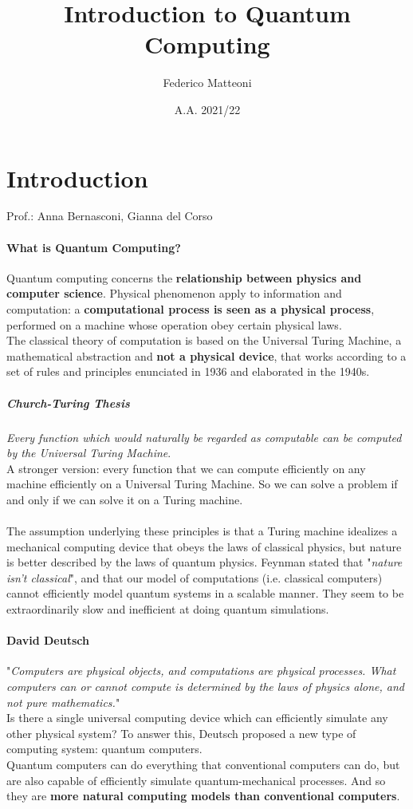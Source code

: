 \documentclass[10pt]{report}
\begin{document}
\title{Introduction to Quantum Computing}
\author{Federico Matteoni}
\date{A.A. 2021/22}
\renewcommand*\contentsname{Index}

\maketitle
\tableofcontents
\pagebreak
\section{Introduction}
Prof.: Anna Bernasconi, Gianna del Corso
\paragraph{What is Quantum Computing?} Quantum computing concerns the \textbf{relationship between physics and computer science}. Physical phenomenon apply to information and computation: a \textbf{computational process is seen as a physical process}, performed on a machine whose operation obey certain physical laws.\\
The classical theory of computation is based on the Universal Turing Machine, a mathematical abstraction and \textbf{not a physical device}, that works according to a set of rules and principles enunciated in 1936 and elaborated in the 1940s.
\subparagraph{Church-Turing Thesis} \textit{Every function which would naturally be regarded as computable can be computed by the Universal Turing Machine}.\\
A stronger version: every function that we can compute efficiently on any machine efficiently on a Universal Turing Machine. So we can solve a problem if and only if we can solve it on a Turing machine.\\\\
The assumption underlying these principles is that a Turing machine idealizes a mechanical computing device that obeys the laws of classical physics, but nature is better described by the laws of quantum physics. Feynman stated that "\textit{nature isn't classical}", and that our model of computations (i.e. classical computers) cannot efficiently model quantum systems in a scalable manner. They seem to be extraordinarily slow and inefficient at doing quantum simulations.
\paragraph{David Deutsch} "\textit{Computers are physical objects, and computations are physical processes. What computers can or cannot compute is determined by the laws of physics alone, and not pure mathematics.}"\\
Is there a single universal computing device which can efficiently simulate any other physical system? To answer this, Deutsch proposed a new type of computing system: quantum computers.\\
Quantum computers can do everything that conventional computers can do, but are also capable of efficiently simulate quantum-mechanical processes. And so they are \textbf{more natural computing models than conventional computers}.
\end{document}
